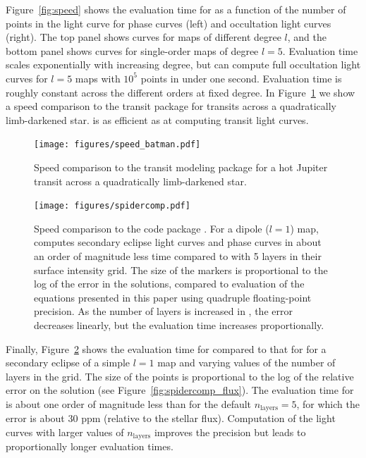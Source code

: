 \documentclass[modern]{aastex61}
\begin{document}
Figure~\ref{fig:speed} shows the evaluation time for \starry
as a function of the number of points in the light curve for phase curves
(left) and occultation light curves (right). The top panel shows curves for
maps of different degree $l$, and the bottom panel shows curves for single-order
maps of degree $l = 5$. Evaluation time scales exponentially with increasing
degree, but \starry can compute full occultation light curves for $l = 5$ maps
with $10^5$ points in under one second. Evaluation time is roughly constant
across the different orders at fixed degree.
In Figure~\ref{fig:speed_batman} we show a speed comparison
to the \batman transit package \citep{Kreidberg2015} for transits across a
quadratically limb-darkened star. \starry is as efficient as \batman at
computing transit light curves.

\begin{figure}[p!]
    \begin{centering}
    \texttt{[image: figures/speed\_batman.pdf]}
    \caption{\label{fig:speed_batman}
             Speed comparison to the \batman transit modeling package
             \citep{Kreidberg2015} for a hot Jupiter transit across a
             quadratically limb-darkened star.
             }
    \end{centering}
\end{figure}

\begin{figure}[ht!]
    \begin{centering}
    \texttt{[image: figures/spidercomp.pdf]}
    \caption{\label{fig:spidercomp}
             Speed comparison to the \spiderman code package \citep{Louden2018}.
             For a dipole ($l = 1$) map, \starry computes secondary eclipse
             light curves and phase curves in about an order of magnitude less
             time compared to \spiderman with 5 layers in their surface intensity
             grid. The size of the markers is proportional to the log of the
             error in the solutions, compared to evaluation of the equations
             presented in this paper using quadruple floating-point precision.
             As the number of layers is increased in \spiderman, the error
             decreases linearly, but the evaluation time increases proportionally.
             }
    \end{centering}
\end{figure}

Finally, Figure~\ref{fig:spidercomp} shows the evaluation time for \starry
compared to that for \spiderman \citep{Louden2018} for a secondary eclipse
of a simple $l = 1$ map and varying values of the number of layers in the
\spiderman grid. The size of the points is proportional to the log of the
relative error on the solution (see Figure~\ref{fig:spidercomp_flux}).
The evaluation time for \starry is about one order of magnitude less than
\spiderman for the default $n_\mathrm{layers}=5$, for which the error
is about 30 ppm (relative to the stellar flux). Computation of the \spiderman
light curves with larger values of $n_\mathrm{layers}$ improves the precision
but leads to proportionally longer evaluation times.
\end{document}
